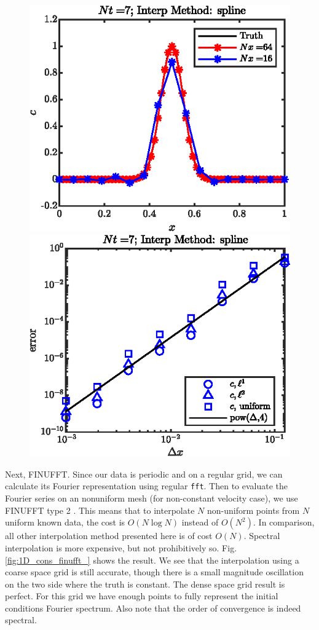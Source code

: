 \documentclass[11pt,letterpaper]{article}
\begin{document}
\begin{figure}[H]
    \centering
    \includegraphics{figs/1D_cons_spline_sol}
    \includegraphics{figs/1D_cons_spline_convord}
    \caption{}\label{fig:1D_cons_spline_}
\end{figure}
Next, FINUFFT. Since our data is periodic and on a regular grid, we can calculate its Fourier representation using regular \texttt{fft}. Then to evaluate the Fourier series on an nonuniform mesh (for non-constant velocity case), we use FINUFFT type 2 \cite{finufft_1}. This means that to interpolate $N$ non-uniform points from $N$ uniform known data, the cost is $O(N\log N)$ instead of $O(N^2)$. In comparison, all other interpolation method presented here is of cost $O(N)$. Spectral interpolation is more expensive, but not prohibitively so. Fig. \ref{fig:1D_cons_finufft_} shows the result. We see that the interpolation using a coarse space grid is still accurate, though there is a small magnitude oscillation on the two side where the truth is constant. The dense space grid result is perfect. For this grid we have enough points to fully represent the initial conditions Fourier spectrum. Also note that the order of convergence is indeed spectral.
\end{document}
